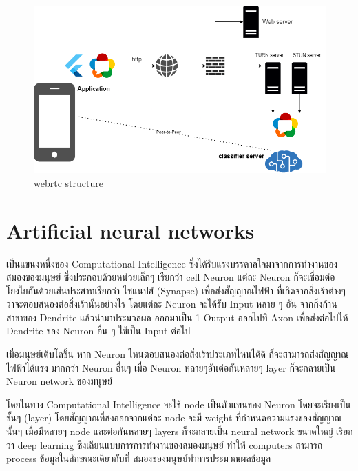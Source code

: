  
\begin{figure}[h]
\begin{center}
\includegraphics[scale=0.5]{pic/webrtc.png}
\end{center}

\caption[webrtc structure]{webrtc structure}
\label{fig:webrtc structure}
\end{figure}



\section{Artificial neural networks} 
เป็นแขนงหนึ่งของ Computational Intelligence ซึ่งได้รับแรงบรรดาลใจมาจากการทำงานของสมองของมนุษย์
ซึ่งประกอบด้วยหน่วยเล็กๆ เรียกว่า cell Neuron แต่ละ Neuron ก็จะเชื่อมต่อโยงใยกันด้วยเส้นประสาทเรียกว่า ไซแนปส์ (Synapse) เพื่อส่งสัญญาณไฟฟ้า ที่เกิดจากสิ่งเร้าต่างๆ ว่าจะตอบสนองต่อสิ่งเร้านั้นอย่างไร 
โดยแต่ละ Neuron จะได้รับ Input หลาย ๆ อัน จากกิ่งก้านสาขาของ Dendrite แล้วนำมาประมวลผล ออกมาเป็น 1 Output ออกไปที่ Axon เพื่อส่งต่อไปให้ Dendrite ของ Neuron อื่น ๆ ใช้เป็น Input ต่อไป

เมื่อมนุษย์เติบโดขึ้น หาก Neuron ไหนตอบสนองต่อสิ่งเร้าประเภทไหนได้ดี ก็จะสามารถส่งสัญญาณไฟฟ้าได้แรง มากกว่า Neuron อื่นๆ
เมื่อ Neuron หลายๆอันต่อกันหลายๆ layer ก็จะกลายเป็น Neuron network ของมนุษย์

โดยในทาง  Computational Intelligence จะใช้ node เป็นตัวแทนของ Neuron โดยจะเรียงเป็นชั้นๆ (layer) 
โดยสัญญาณที่ส่งออกจากแต่ละ node จะมี weight ที่กำหนดความแรงของสัญญาณนั้นๆ เมื่อมีหลายๆ node และต่อกันหลายๆ layers
ก็จะกลายเป็น neural network ขนาดใหญ่ เรียกว่า deep learning ซึ่งเลียนแบบการการทำงานของสมองมนุษย์
ทำให้  computers สามารถ process ข้อมูลในลักษณะเดียวกับที่ สมองของมนุษย์ทำการประมวณผลข้อมูล 

